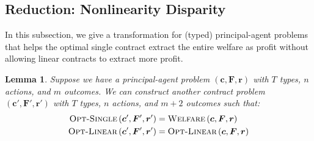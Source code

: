 \documentclass{article}
\newtheorem{lemma}[theorem]{Lemma}
\newcommand{\costvector}{\bm{c}}
\newcommand{\ForecastTensor}{\bm{F}}
\newcommand{\rewardvector}{\bm{r}}
\newcommand{\PrincipalAgentProblem}{\left(\costvector, \ForecastTensor, \rewardvector\right)}
\newcommand{\PrincipalAgentProblemPrime}{\left(\costvector', \ForecastTensor', \rewardvector'\right)}
\newcommand{\OWelfare}{\textsc{Welfare}}
\newcommand{\OSingle}{\textsc{Opt-Single}}
\newcommand{\OLinear}{\textsc{Opt-Linear}}
\begin{document}
\subsection{Reduction: Nonlinearity Disparity}
\label{subsec:nonlinearity-disparity}

In this subsection, we give a transformation for (typed) principal-agent problems that helps the optimal single contract extract the entire welfare as profit without allowing linear contracts to extract more profit.

\begin{lemma}
\label{lem:nonlinearity-disparity}
  Suppose we have a principal-agent problem $\PrincipalAgentProblem$ with $T$ types, $n$ actions, and $m$ outcomes. We can construct another contract problem $\PrincipalAgentProblemPrime$ with $T$ types, $n$ actions, and $m+2$ outcomes such that:
  \begin{align*}
    \OSingle \PrincipalAgentProblemPrime &= \OWelfare \PrincipalAgentProblem \\
    \OLinear \PrincipalAgentProblemPrime &= \OLinear \PrincipalAgentProblem
  \end{align*}
\end{lemma}
\end{document}
